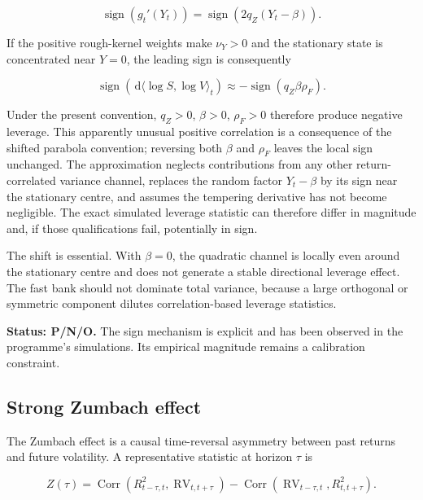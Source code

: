 \documentclass[11pt,a4paper]{article}
\newcommand{\dd}{\,\mathrm{d}}
\newcommand{\Corr}{\operatorname{Corr}}
\begin{document}
\begin{equation*}
\operatorname{sign}(g_t'(Y_t))
=\operatorname{sign}\!\left(2q_Z(Y_t-\beta)\right).
\end{equation*}

If the positive rough-kernel weights make \(\nu_Y>0\) and the stationary state is concentrated
near \(Y=0\), the leading sign is consequently

\begin{equation}
\operatorname{sign}\!\left(\dd\langle \log S,\log V\rangle_t\right)
\approx -\operatorname{sign}(q_Z\beta\rho_F).
\label{eq:leverage-sign}
\end{equation}

Under the present convention, \(q_Z>0\), \(\beta>0\), \(\rho_F>0\) therefore produce negative
leverage. This apparently unusual positive correlation is a consequence of the shifted
parabola convention; reversing both \(\beta\) and \(\rho_F\) leaves the local sign unchanged.
The approximation neglects contributions from any other return-correlated variance channel,
replaces the random factor \(Y_t-\beta\) by its sign near the stationary centre, and assumes the
tempering derivative has not become negligible.  The exact simulated leverage statistic can
therefore differ in magnitude and, if those qualifications fail, potentially in sign.

The shift is essential. With \(\beta=0\), the quadratic channel is locally even around the
stationary centre and does not generate a stable directional leverage effect. The fast bank
should not dominate total variance, because a large orthogonal or symmetric component dilutes
correlation-based leverage statistics.

\textbf{Status: P/N/O.} The sign mechanism is explicit and has been observed in the programme's
simulations. Its empirical magnitude remains a calibration constraint.

\subsection{Strong Zumbach effect}

The Zumbach effect is a causal time-reversal asymmetry between past returns and future
volatility. A representative statistic at horizon \(\tau\) is

\begin{equation}
Z(\tau)
=\Corr\!\left(R_{t-\tau,t}^2,\operatorname{RV}_{t,t+\tau}\right)
-\Corr\!\left(\operatorname{RV}_{t-\tau,t},R_{t,t+\tau}^2\right).
\label{eq:zumbach}
\end{equation}
\end{document}
